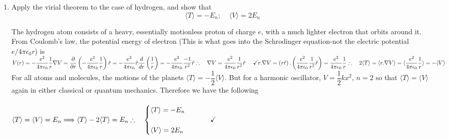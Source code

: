 \documentclass[fleqn]{article}
\begin{document}
\begin{enumerate}
\begin{enumerate}
      \item Apply the virial theorem to the case of hydrogen, and show that
      $$\langle T \rangle=-E_n; ~~~~~ \langle V \rangle=2E_n$$

        \textcolor{hwColor}{
          The hydrogen atom consists of a heavy, essentially motionless proton of charge $e$, with a much lighter electron that orbits around it.
          From Coulomb's law, the potential energy of electron (This is what goes into the Schr$\ddot{o}$dinger equation-not the electric potential
          $e/4 \pi \epsilon_0 r$) is
          $
            V(r)=-\dfrac{e^2}{4 \pi \epsilon_0} \dfrac{1}{r}
            \\
            \\
            \\
            \nabla V=\dfrac{\partial }{\partial r} \left(-\dfrac{e^2}{4 \pi \epsilon_0} \dfrac{1}{r}\right) \hat{r}
            =-\dfrac{e^2}{4 \pi \epsilon_0} \hat{r} \dfrac{d}{dr} \left(\dfrac{1}{r}\right)
            =-\dfrac{e^2}{4 \pi \epsilon_0} \dfrac{-1}{r^2} \hat{r}
            \\
            \\
            \\
            \therefore ~~~ \nabla V=\dfrac{e^2}{4 \pi \epsilon_0} \dfrac{1}{r^2} \hat{r} ~~~~ \checkmark
            \\
            \\
            \\
            r.\nabla V=\left(r \hat{r}\right).\left(\dfrac{e^2}{4 \pi \epsilon_0} \dfrac{1}{r^2} \hat{r}\right)
            =\dfrac{e^2}{4 \pi \epsilon_0} \dfrac{1}{r}
            \\
            \\
            \\
            \therefore ~~~ 2 \langle T \rangle=\langle r. \nabla V \rangle=\langle \dfrac{e^2}{4 \pi \epsilon_0} \dfrac{1}{r} \rangle=-\langle V \rangle
            \\
            \\
          $
          For all atoms and molecules, the motions of the planets $\langle T \rangle=-\dfrac{1}{2} \langle V \rangle$. But for a
          harmonic oscillator, $V=\dfrac{1}{2} kx^2$, $n=2$ so that $\langle T \rangle=\langle V \rangle$ again in either 
          classical or quantum mechanics. Therefore we have the following
          \\
          \\
          $
            \langle T \rangle=\langle V \rangle=E_n \Longrightarrow \langle T \rangle-2\langle T \rangle=E_n
            \\
            \\
            \\
            \therefore ~~~ \begin{cases}
              \langle T \rangle=-E_n
              \\
              \\
              \langle V \rangle=2 E_n
            \end{cases} ~~~~~~~ \checkmark
          $
        }


\end{enumerate}
\end{enumerate}
\end{document}
